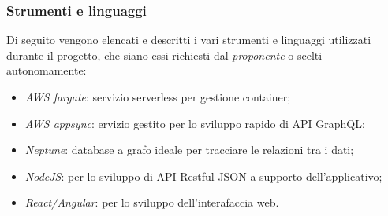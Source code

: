 \subsubsection{Strumenti e linguaggi}
Di seguito vengono elencati e descritti i vari strumenti e linguaggi utilizzati durante il progetto, che siano essi richiesti dal \emph{proponente} o scelti autonomamente:
\begin{itemize}
	\item \emph{AWS fargate}: servizio serverless per gestione container;
	\item \emph{AWS appsync}: ervizio gestito per lo sviluppo rapido di API GraphQL;
	\item \emph{Neptune}: database a grafo ideale per tracciare le relazioni tra i dati; \\
	\item \emph{NodeJS}: per lo sviluppo di API Restful JSON a supporto dell'applicativo;
	\item \emph{React/Angular}: per lo sviluppo dell'interafaccia web. 
\end{itemize}
